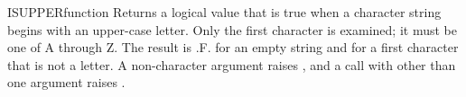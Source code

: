 \begin{XbaseEntry}{ISUPPER}{function}
Returns a logical value that is true when a character string begins with an upper-case letter.
\Syntax
{}
\Usage
Only the first character is examined; it must be one of A through Z. The result is .F. for an empty string and for a first character that is not a letter. A non-character argument raises , and a call with other than one argument raises .
\Examples
{}
\end{XbaseEntry}

